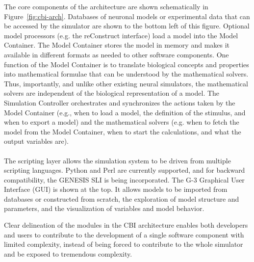 \documentclass[10pt]{article}
\begin{document}
The core components of the architecture are shown schematically in
Figure~\ref{fig:cbi-arch}. Databases of
neuronal models or experimental data that can be accessed by the
simulator are shown to the bottom left of this figure. Optional model processors (e.g. the reConstruct interface) load a model into the Model Container.  The Model Container
stores the model in memory and makes it available in different formats as needed to other software
components.  One function of the Model Container
is to translate biological concepts and properties into mathematical
formulae that can be understood by the mathematical solvers. Thus,
importantly, and unlike other existing neural simulators, the
mathematical solvers are independent of the biological representation
of a model. The Simulation Controller orchestrates and synchronizes
the actions taken by the Model Container (e.g., when to load a model,
the definition of the stimulus, and when to export a model) and the
mathematical solvers (e.g. when to fetch the model from the Model
Container, when to start the calculations, and what the output
variables are). \\

 \\

The scripting layer allows the simulation system to be driven from
multiple scripting languages. Python and Perl are currently supported,
and for backward compatibility, the GENESIS SLI is being
incorporated. The G-3 Graphical User Interface (GUI) is shown at the top.
It allows models to be imported from databases or constructed from
scratch, the exploration of model structure and parameters, and the
visualization of variables and model behavior.

Clear delineation of the modules in the CBI architecture enables both
developers and users to contribute to the development of a single software component
with limited complexity, instead of being forced to contribute to the
whole simulator and be exposed to tremendous complexity.
\end{document}
